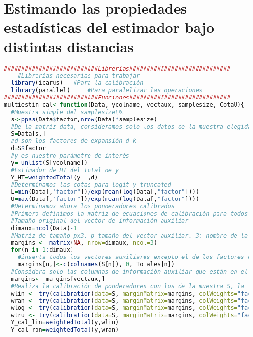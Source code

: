 \documentclass[a4paper,twoside,openright,12pt]{book}
\theoremstyle{definition}
\numberwithin{equation}{chapter}
\numberwithin{figure}{chapter}
\numberwithin{table}{chapter}
\numberwithin{theorem}{chapter}
\numberwithin{lemma}{chapter}
\begin{document}
\chapter{Estimando las propiedades estadísticas del estimador bajo distintas distancias}\label{anx:C}
\begin{lstlisting}[language=R]
###########################Librerías#############################
	#Librerías necesarias para trabajar
  library(icarus)	#Para la calibración
  library(parallel) 	#Para paralelizar las operaciones
###########################Funciones#############################
multiestim_cal<-function(Data, ycolname, vectaux, samplesize, CotaU){
  #Muestra simple del samplesize\%
  s<-ppss(Data$factor,nrow(Data)*samplesize)
  #De la matriz data, consideramos solo los datos de la muestra elegida
  S=Data[s,]
  #d son los factores de expansión d_k
  d=S$factor
  #y es nuestro parámetro de interés
  y= unlist(S[ycolname])
  #Estimador de HT del total de y
  Y_HT=weightedTotal(y	,d)
  #Determinamos las cotas para logit y truncated
  L=min(Data[,"factor"])/exp(mean(log(Data[,"factor"])))
  U=max(Data[,"factor"])/exp(mean(log(Data[,"factor"])))
  #Determinamos ahora los ponderadores calibrados
  #Primero definimos la matriz de ecuaciones de calibración para todos los datos
  #Tamaño original del vector de información auxiliar
  dimaux=ncol(Data)-1
  #Matriz de tamaño px3, p-tamaño del vector auxiliar, 3: nombre de la variable auxiliar[,1], cantidad de categorías, que fijamos en 1[,2], total por cada categoría[,3]
  margins <- matrix(NA, nrow=dimaux, ncol=3)
  for(n in 1:dimaux)
    #inserta todos los vectores auxiliares excepto el de los factores de expansión
    margins[n,]<-c(colnames(S[n]), 0, Totales[n])
  #Considera solo las columnas de información auxiliar que están en el arreglo vectaux
  margins<- margins[vectaux,]
  #Realiza la calibración de ponderadores con los de la muestra S, la información auxiliar de margins, los ponderadores iniciales de ``factor'', por los distintos métodos
  wlin <- try(calibration(data=S, marginMatrix=margins, colWeights="factor",method="linear" ,description=FALSE),TRUE)
  wran <- try(calibration(data=S, marginMatrix=margins, colWeights="factor",method="raking" ,description=FALSE), TRUE)
  wlog <- try(calibration(data=S, marginMatrix=margins, colWeights="factor",method="logit" , bounds=c(L,U*CotaU),description=FALSE),TRUE)#0 a 55500
  wtru <- try(calibration(data=S, marginMatrix=margins, colWeights="factor",method="truncated" ,bounds=c(L,U*CotaU),description=FALSE),TRUE)
  Y_cal_lin=weightedTotal(y,wlin)
  Y_cal_ran=weightedTotal(y,wran)

\end{lstlisting}
\end{document}
